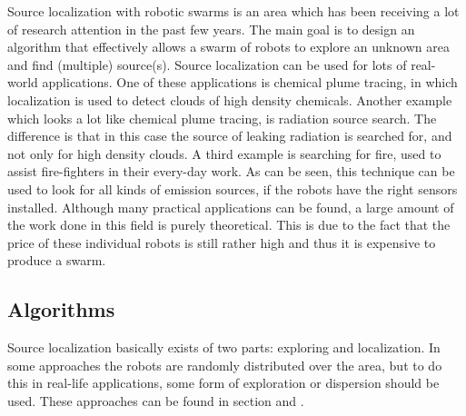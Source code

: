 
Source localization with robotic swarms is an area which has been receiving a lot of research attention in the past few years. 
The main goal is to design an algorithm that effectively allows a swarm of robots to explore an unknown area and find (multiple) source(s).
Source localization can be used for lots of real-world applications.
One of these applications is chemical plume tracing, in which localization is used to detect clouds of high density chemicals. \cite{zarzhitsky2005distributed}
Another example which looks a lot like chemical plume tracing, is radiation source search. \cite{bashyal2008human} 
The difference is that in this case the source of leaking radiation is searched for, and not only for high density clouds. 
A third example is searching for fire, used to assist fire-fighters in their every-day work. \cite{marjovi2009multi}
As can be seen, this technique can be used to look for all kinds of emission sources, if the robots have the right sensors installed. \cite{cui2004swarm}
Although many practical applications can be found, a large amount of the work done in this field is purely theoretical.
This is due to the fact that the price of these individual robots is still rather high and thus it is expensive to produce a swarm.


\subsection{Algorithms}
Source localization basically exists of two parts: exploring and localization.
In some approaches the robots are randomly distributed over the area, but to do this in real-life applications, some form of exploration or dispersion should be used.
These approaches can be found in section \label{sec:Exploration} and \label{sec:Dispersion}.

